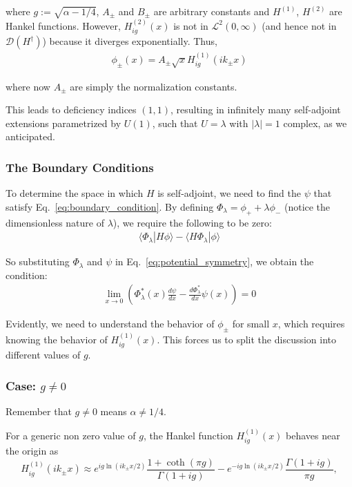 where $g := \sqrt{\alpha - 1/4}$, $A_\pm$ and $B_\pm$ are arbitrary constants and $H^{(1)}$, $H^{(2)}$ are Hankel functions.
However, $H_{ig}^{(2)}(x)$ is not in $\mathcal{L}^2(0,\infty)$ (and hence not in $\mathcal{D}({H^\dagger})$) because it diverges exponentially. Thus,
\begin{align*}
    \phi_\pm(x) = A_\pm \sqrt{x} H_{ig}^{(1)}(ik_\pm x)
\end{align*}

where now $A_\pm$ are simply the normalization constants.

\noindent
This leads to deficiency indices \((1, 1)\), resulting in infinitely many self-adjoint extensions parametrized by \(U(1)\), such that $U = \lambda$ with $|\lambda| = 1$ complex, as we anticipated.

\subsubsection*{The Boundary Conditions}

To determine the space in which $H$ is self-adjoint, we need to find the $\psi$ that satisfy Eq.~\eqref{eq:boundary_condition}. By defining $\Phi_\lambda = \phi_+ + \lambda \phi_-$ (notice the dimensionless nature of $\lambda$), we require the following to be zero:
\begin{align*}
    \langle \Phi_\lambda | H \phi \rangle - \langle H \Phi_\lambda |  \phi \rangle
\end{align*}

\noindent
So substituting $\Phi_\lambda$ and $\psi$ in Eq.~\eqref{eq:potential_symmetry}, we obtain the condition:
\begin{align}
    \lim_{x \to 0}\left(\Phi_\lambda^*(x)\frac{d\psi}{dx} - \frac{d\Phi_\lambda^*}{dx}\psi(x)\right) = 0
    \label{eq:potential_bound_explicit}
\end{align}

\noindent
Evidently, we need to understand the behavior of $\phi_\pm$ for small $x$, which requires knowing the behavior of $H_{ig}^{(1)}(x)$. This forces us to split the discussion into different values of $g$.

\subsubsection{Case: \(g \neq 0\)}
Remember that $g \neq 0$ means $\alpha \neq 1/4$.

For a generic non zero value of $g$, the Hankel function $H_{ig}^{(1)}(x)$ behaves near the origin as~\cite{gradshteyn2007}
\begin{equation}
    H_{ig}^{(1)}(ik_\pm x) \approx e^{ig \ln(ik_\pm x/2)}\frac{1 + \coth(\pi g)}{\Gamma(1+ig)} - e^{-ig \ln(ik_\pm x/2)}\frac{\Gamma(1+ig)}{\pi g},
    \label{eq:generig_hankel}
\end{equation}

